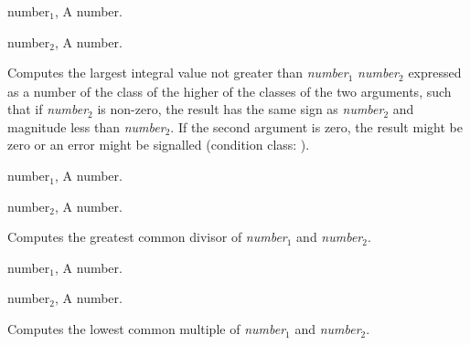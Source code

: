 \begin{optDefinition}
%
\begin{genericargs}
    \item[number$_1$, \classref{number}] A number.
    \item[number$_2$, \classref{number}] A number.
\end{genericargs}
%
\result%
Computes the largest integral value not greater than {\em
    number$_1$}$\over${\em{}number$_2$} expressed as a number of the class of
the higher of the classes of the two arguments, such that if {\em number$_2$} is
non-zero, the result has the same sign as {\em number$_2$} and magnitude less
than {\em number$_2$}.  If the second argument is zero, the result might be zero
or an error might be signalled (condition class:
).

%
\begin{genericargs}
    \item[number$_1$, \classref{number}] A number.
    \item[number$_2$, \classref{number}] A number.
\end{genericargs}
%
\result%
Computes the greatest common divisor of {\em number$_1$} and {\em number$_2$}.

%
\begin{genericargs}
    \item[number$_1$, \classref{number}] A number.
    \item[number$_2$, \classref{number}] A number.
\end{genericargs}
%
\result%
Computes the lowest common multiple of {\em number$_1$} and {\em number$_2$}.
%
\end{optDefinition}
